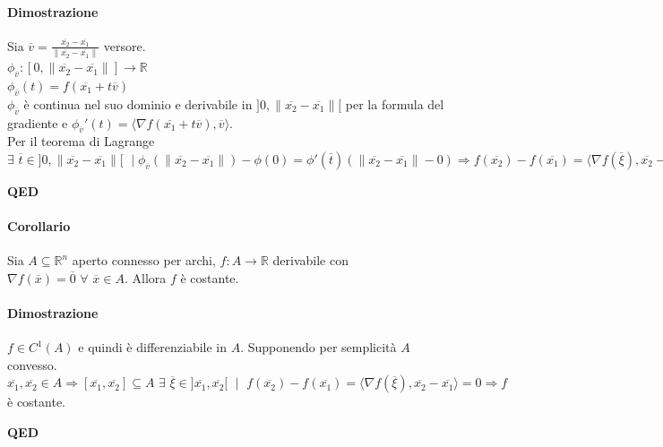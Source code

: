 \documentclass{article}
\newcommand{\R}{\mathbb{R}}
\begin{document}
\paragraph{{Dimostrazione}}
Sia $\overline{v}=\frac{\overline{x_2}-\overline{x_1}}{\|\overline{x_2}-\overline{x_1}\|}$ versore.\\
$\phi_{\overline{v}}:[0,\|\overline{x_2}-\overline{x_1}\|]\rightarrow\R$\\
$\phi_{\overline{v}}(t)=f(\overline{x_1}+t\overline{v})$\\
$\phi_{\overline{v}}$ è continua nel suo dominio e derivabile in $]0,\| \overline{x_2}-\overline{x_1} \|[$ per la formula del gradiente e $\phi_{\overline{v}}'(t)=\langle\nabla f(\overline{x_1}+t\overline{v}),\overline{v}\rangle$. \\
Per il teorema di Lagrange $\exists\,\, \overline{t}\in]0,\|\overline{x_2}-\overline{x_1}\|[\,\, \mid \phi_{\overline{v}}(\|\overline{x_2}-\overline{x_1}\|)-\phi(0)=\phi'(\overline{t})(\|\overline{x_2}-\overline{x_1}\|-0)\Rightarrow f(\overline{x_2})-f(\overline{x_1})=\langle\nabla f(\overline{\xi}),\overline{x_2}-\overline{x_1}\rangle$
\begin{flushright}
\textbf{QED}
\end{flushright}

\paragraph{{Corollario}}
Sia $A \subseteq \R^n$ aperto connesso per archi, $f:A \rightarrow \R$ derivabile con $\nabla f(\overline{x})=\overline{0}\,\, \forall \,\, \overline{x} \in A$. Allora $f$ è costante. 

\paragraph{{Dimostrazione}}
$f \in C^1(A)$ e quindi è differenziabile in $A$. Supponendo per semplicità $A$ convesso. $\overline{x_1},\overline{x_2}\in A\Rightarrow [\overline{x_1},\overline{x_2}]\subseteq A \,\,\exists \,\, \overline{\xi}\in ]\overline{x_1},\overline{x_2}[\,\,\mid\,\, f(\overline{x_2})-f(\overline{x_1})=\langle\nabla f(\overline{\xi}),\overline{x_2}-\overline{x_1}\rangle =0 \Rightarrow f$ è costante.
\begin{flushright}
\textbf{QED}
\end{flushright}
\end{document}
